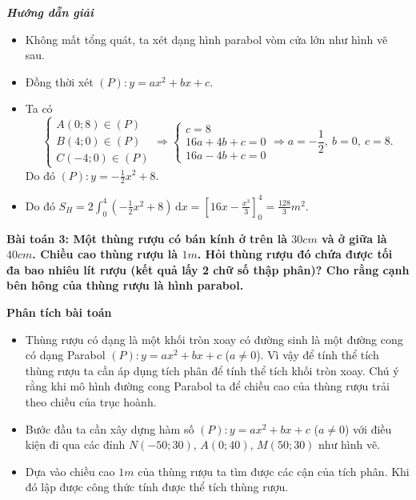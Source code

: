 \documentclass[12pt,a4paper]{article}
\newcommand{\dd}{\,\mathrm{d}}
\newcommand{\analysis}{\noindent\raisebox{0.15ex}{\rule{1.6ex}{1.6ex}}\hspace{4pt}\textbf{Phân tích bài toán}\par}
\newcommand{\solution}{\begin{center}\textbf{\textit{Hướng dẫn giải}}\end{center}\par}
\begin{document}
\solution
\begin{itemize}
\item Không mất tổng quát, ta xét dạng hình parabol vòm cửa lớn như hình vẽ sau.
\item Đồng thời xét $(P):y=ax^2+bx+c$.
\item Ta có
\[
\begin{cases}
A(0;8)\in(P)\\
B(4;0)\in(P)\\
C(-4;0)\in(P)
\end{cases}
\Longrightarrow
\begin{cases}
c=8\\16a+4b+c=0\\16a-4b+c=0
\end{cases}
\Longrightarrow a=-\frac12,\ b=0,\ c=8.
\]
Do đó $(P):y=-\frac12x^2+8$.
\item Do đó $S_H=2\int_0^4\left(-\frac12x^2+8\right)\dd x=\left[16x-\frac{x^3}{3}\right]_0^4=\frac{128}{3}m^2$.
\end{itemize}

\textbf{Bài toán 3: Một thùng rượu có bán kính ở trên là $30cm$ và ở giữa là $40cm$. Chiều cao thùng rượu là $1m$. Hỏi thùng rượu đó chứa được tối đa bao nhiêu lít rượu (kết quả lấy 2 chữ số thập phân)? Cho rằng cạnh bên hông của thùng rượu là hình parabol.}\par\medskip
\begin{center}\end{center}
\begin{analysisbox}
\analysis
\begin{itemize}
\item Thùng rượu có dạng là một khối tròn xoay có đường sinh là một đường cong có dạng Parabol $(P):y=ax^2+bx+c$ ($a\ne0$). Vì vậy để tính thể tích thùng rượu ta cần áp dụng tích phân để tính thể tích khối tròn xoay. Chú ý rằng khi mô hình đường cong Parabol ta để chiều cao của thùng rượu trải theo chiều của trục hoành.
\item Bước đầu ta cần xây dựng hàm số $(P):y=ax^2+bx+c$ ($a\ne0$) với điều kiện đi qua các đỉnh $N(-50;30)$, $A(0;40)$, $M(50;30)$ như hình vẽ.
\item Dựa vào chiều cao $1m$ của thùng rượu ta tìm được các cận của tích phân. Khi đó lập được công thức tính được thể tích thùng rượu.
\end{itemize}
\end{analysisbox}
\end{document}
